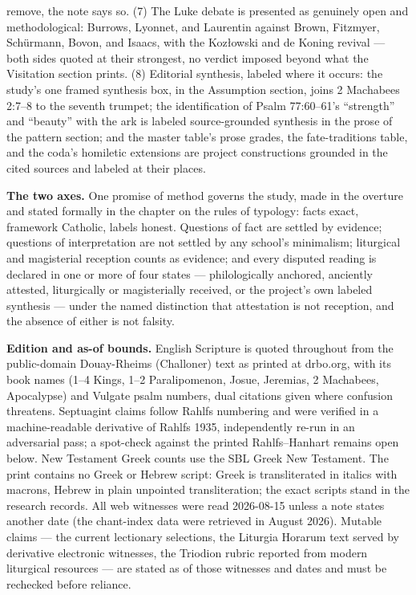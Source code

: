 remove, the note says so. (7) The Luke debate is presented as genuinely
open and methodological: Burrows, Lyonnet, and Laurentin against Brown,
Fitzmyer, Schürmann, Bovon, and Isaacs, with the Kozłowski and de Koning
revival --- both sides quoted at their strongest, no verdict imposed
beyond what the Visitation section prints. (8) Editorial synthesis,
labeled where it occurs: the study's one framed synthesis box, in the
Assumption section, joins 2 Machabees 2:7--8 to the seventh trumpet; the
identification of Psalm 77:60--61's ``strength'' and ``beauty'' with the
ark is labeled source-grounded synthesis in the prose of the pattern
section; and the master table's prose grades, the fate-traditions table,
and the coda's homiletic extensions are project constructions grounded in
the cited sources and labeled at their places.

\textbf{The two axes.} One promise of method governs the study, made in
the overture and stated formally in the chapter on the rules of typology: facts exact, framework
Catholic, labels honest. Questions of fact are settled by evidence;
questions of interpretation are not settled by any school's minimalism;
liturgical and magisterial reception counts as evidence; and every
disputed reading is declared in one or more of four states ---
philologically anchored, anciently attested, liturgically or
magisterially received, or the project's own labeled synthesis --- under
the named distinction that attestation is not reception, and the absence
of either is not falsity.

\textbf{Edition and as-of bounds.} English Scripture is quoted throughout
from the public-domain Douay-Rheims (Challoner) text as printed at
drbo.org, with its book names (1--4 Kings, 1--2 Paralipomenon, Josue,
Jeremias, 2 Machabees, Apocalypse) and Vulgate psalm numbers, dual
citations given where confusion threatens. Septuagint claims follow
Rahlfs numbering and were verified in a machine-readable derivative of
Rahlfs 1935, independently re-run in an adversarial pass; a spot-check
against the printed Rahlfs--Hanhart remains open below. New Testament
Greek counts use the SBL Greek New Testament. The print contains no
Greek or Hebrew script: Greek is transliterated in italics with macrons,
Hebrew in plain unpointed transliteration; the exact scripts stand in
the research records. All web witnesses were read 2026-08-15 unless a
note states another date (the chant-index data were retrieved in August
2026). Mutable claims --- the current lectionary selections, the
Liturgia Horarum text served by derivative electronic witnesses, the
Triodion rubric reported from modern liturgical resources --- are stated
as of those witnesses and dates and must be rechecked before reliance.

